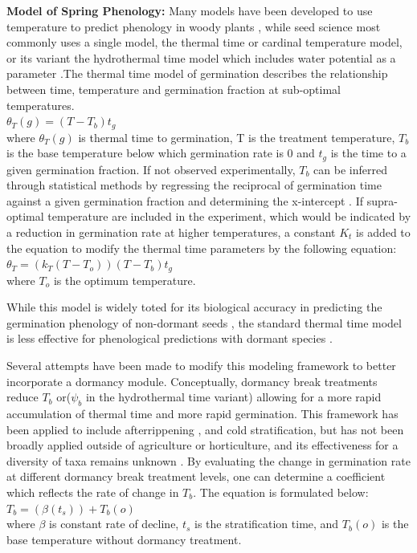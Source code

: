 \documentclass[12pt]{article}\usepackage[]{graphicx}\usepackage[]{color}
\begin{document}
\textbf{Model of Spring Phenology:} Many models have been developed to use temperature to predict phenology in woody plants \citep{Chuine2002}, while seed science most commonly uses a single model, the thermal time or cardinal temperature model, or its variant the hydrothermal time model which includes water potential as a parameter \citep {Bradford2002}.The thermal time model of germination describes the relationship between time, temperature and germination fraction at sub-optimal temperatures.\\
\indent$\theta_{T}(g)=(T-T_{b})t_{g}$\\
where $\theta_{T}(g)$ is thermal time to germination, T is the treatment temperature, $T_b$ is the base temperature below which germination rate is 0 and $t_g$ is the time to a given germination fraction. If not observed experimentally, $T_b$ can be inferred through statistical methods by regressing the reciprocal of germination time against a given germination fraction and determining the x-intercept \citep{Pritchard1999}.
If supra-optimal temperature are included in the experiment, which would be indicated by a reduction in germination rate at higher temperatures, a constant $K_t$ is added to the equation to modify the thermal time parameters by the following equation:\\
\indent$\theta_{T}=(k_{T}(T-T_{o}))(T-T_{b})t_{g}$\\
where $T_o$ is the optimum temperature.
\par While this model is widely toted for its biological accuracy in predicting the germination phenology of non-dormant seeds \citep{Bradford2005}, the standard thermal time model is less effective for phenological predictions with dormant species \citep{Batlla2015}.
\par Several attempts have been made to modify this modeling framework to better incorporate a dormancy module. Conceptually, dormancy break treatments reduce $T_b$ or($\psi_b$ in the hydrothermal time variant) allowing for a more rapid accumulation of thermal time and more rapid germination. This framework has been applied to include afterrippening \citep{Meyer2000}, and cold stratification\citep{Pritchard1996,Batlla2003}, but has not been broadly applied outside of agriculture or horticulture, and its effectiveness for a diversity of taxa remains unknown \citep{Steadman2004}. By evaluating the change in germination rate at different dormancy break treatment levels, one can determine a coefficient which reflects the rate of change in $T_b$. The equation is formulated below:\\
\indent$T_b= (\beta(t_s))+T_b(o)$\\
where $\beta$ is constant rate of decline, $t_s$ is the stratification time, and $T_b(o)$ is the base temperature without dormancy treatment.
\end{document}
